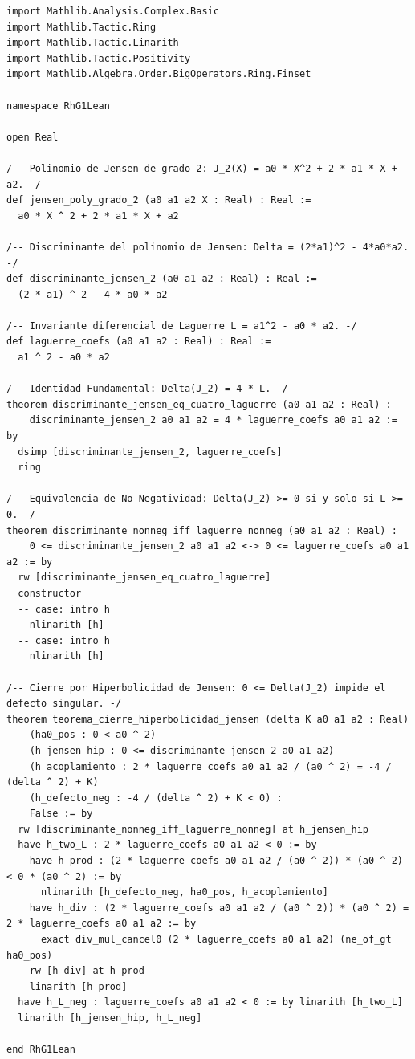 \documentclass[11pt,a4paper]{article}
\theoremstyle{definition}
\theoremstyle{remark}
\begin{document}
\begin{lstlisting}[language=Lean4]
import Mathlib.Analysis.Complex.Basic
import Mathlib.Tactic.Ring
import Mathlib.Tactic.Linarith
import Mathlib.Tactic.Positivity
import Mathlib.Algebra.Order.BigOperators.Ring.Finset

namespace RhG1Lean

open Real

/-- Polinomio de Jensen de grado 2: J_2(X) = a0 * X^2 + 2 * a1 * X + a2. -/
def jensen_poly_grado_2 (a0 a1 a2 X : Real) : Real :=
  a0 * X ^ 2 + 2 * a1 * X + a2

/-- Discriminante del polinomio de Jensen: Delta = (2*a1)^2 - 4*a0*a2. -/
def discriminante_jensen_2 (a0 a1 a2 : Real) : Real :=
  (2 * a1) ^ 2 - 4 * a0 * a2

/-- Invariante diferencial de Laguerre L = a1^2 - a0 * a2. -/
def laguerre_coefs (a0 a1 a2 : Real) : Real :=
  a1 ^ 2 - a0 * a2

/-- Identidad Fundamental: Delta(J_2) = 4 * L. -/
theorem discriminante_jensen_eq_cuatro_laguerre (a0 a1 a2 : Real) :
    discriminante_jensen_2 a0 a1 a2 = 4 * laguerre_coefs a0 a1 a2 := by
  dsimp [discriminante_jensen_2, laguerre_coefs]
  ring

/-- Equivalencia de No-Negatividad: Delta(J_2) >= 0 si y solo si L >= 0. -/
theorem discriminante_nonneg_iff_laguerre_nonneg (a0 a1 a2 : Real) :
    0 <= discriminante_jensen_2 a0 a1 a2 <-> 0 <= laguerre_coefs a0 a1 a2 := by
  rw [discriminante_jensen_eq_cuatro_laguerre]
  constructor
  -- case: intro h
    nlinarith [h]
  -- case: intro h
    nlinarith [h]

/-- Cierre por Hiperbolicidad de Jensen: 0 <= Delta(J_2) impide el defecto singular. -/
theorem teorema_cierre_hiperbolicidad_jensen (delta K a0 a1 a2 : Real)
    (ha0_pos : 0 < a0 ^ 2)
    (h_jensen_hip : 0 <= discriminante_jensen_2 a0 a1 a2)
    (h_acoplamiento : 2 * laguerre_coefs a0 a1 a2 / (a0 ^ 2) = -4 / (delta ^ 2) + K)
    (h_defecto_neg : -4 / (delta ^ 2) + K < 0) :
    False := by
  rw [discriminante_nonneg_iff_laguerre_nonneg] at h_jensen_hip
  have h_two_L : 2 * laguerre_coefs a0 a1 a2 < 0 := by
    have h_prod : (2 * laguerre_coefs a0 a1 a2 / (a0 ^ 2)) * (a0 ^ 2) < 0 * (a0 ^ 2) := by
      nlinarith [h_defecto_neg, ha0_pos, h_acoplamiento]
    have h_div : (2 * laguerre_coefs a0 a1 a2 / (a0 ^ 2)) * (a0 ^ 2) = 2 * laguerre_coefs a0 a1 a2 := by
      exact div_mul_cancel0 (2 * laguerre_coefs a0 a1 a2) (ne_of_gt ha0_pos)
    rw [h_div] at h_prod
    linarith [h_prod]
  have h_L_neg : laguerre_coefs a0 a1 a2 < 0 := by linarith [h_two_L]
  linarith [h_jensen_hip, h_L_neg]

end RhG1Lean
\end{lstlisting}
\end{document}
